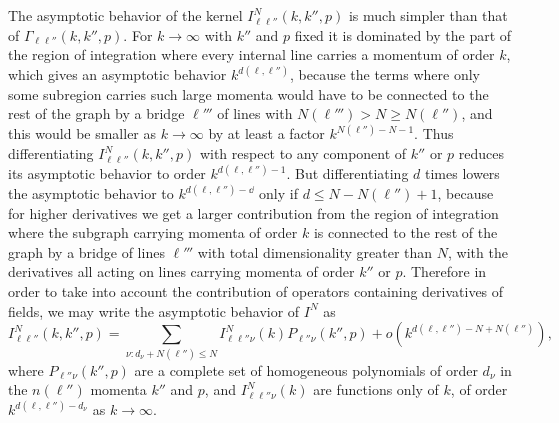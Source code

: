 The asymptotic behavior of the kernel $I_{\ell\ell''}^N(k,k'',p)$ is much simpler than that of $\Gamma_{\ell\ell''}(k,k'',p)$. For $k\to\infty$ with $k''$ and $p$ fixed it is dominated by the part of the region of integration where every internal line carries a momentum of order $k$, which gives an asymptotic behavior $k^{d(\ell,\ell'')}$, because the terms where only some subregion carries such large momenta would have to be connected to the rest of the graph by a bridge $\ell'''$ of lines with $N(\ell''')>N\geq N(\ell'')$, and this would be smaller as $k\to\infty$ by at least a factor $k^{N(\ell'')-N-1}$. Thus differentiating $I_{\ell\ell''}^N(k,k'',p)$ with respect to any component of $k''$ or $p$ reduces its asymptotic behavior to order $k^{d(\ell,\ell'')-1}$. But differentiating $d$ times lowers the asymptotic behavior to $k^{d(\ell,\ell'')-\dd}$ only if $d\leq N-N(\ell'')+1$, because for higher derivatives we get a larger contribution from the region of integration where the subgraph carrying momenta of order $k$ is connected to the rest of the graph by a bridge of lines $\ell'''$ with total dimensionality greater than $N$, with the derivatives all acting on lines carrying momenta of order $k''$ or $p$. Therefore in order to take into account the contribution of operators containing derivatives of fields, we may write the asymptotic behavior of $I^N$ as
\begin{equation}
I_{\ell\ell''}^N(k,k'',p)
=
\sum_{\nu:d_\nu+N(\ell'')\leq N}
I_{\ell\ell''\nu}^N(k)
P_{\ell''\nu}(k'',p)
+o\left(k^{d(\ell,\ell'')-N+N(\ell'')}\right),
\tag{20.A.6}\label{eq:20.A.6}
\end{equation}
where $P_{\ell''\nu}(k'',p)$ are a complete set of homogeneous polynomials of order $d_\nu$ in the $n(\ell'')$ momenta $k''$ and $p$, and $I_{\ell\ell''\nu}^N(k)$ are functions only of $k$, of order $k^{d(\ell,\ell'')-d_\nu}$ as $k\to\infty$.

